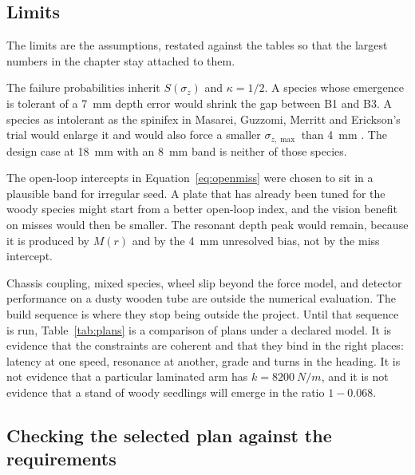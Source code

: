 \subsection{Limits}

The limits are the assumptions, restated against the tables so that the largest numbers in the chapter stay attached to them.

The failure probabilities inherit \(S(\sigma_z)\) and \(\kappa=1/2\). A species whose emergence is tolerant of a \SI{7}{mm} depth error would shrink the gap between B1 and B3. A species as intolerant as the spinifex in Masarei, Guzzomi, Merritt and Erickson's trial would enlarge it and would also force a smaller \(\sigma_{z,\max}\) than \SI{4}{mm} \cite{masarei2019}. The design case at \SI{18}{mm} with an \SI{8}{mm} band is neither of those species.

The open-loop intercepts in Equation~\eqref{eq:openmiss} were chosen to sit in a plausible band for irregular seed. A plate that has already been tuned for the woody species might start from a better open-loop index, and the vision benefit on misses would then be smaller. The resonant depth peak would remain, because it is produced by \(M(r)\) and by the \SI{4}{mm} unresolved bias, not by the miss intercept.

Chassis coupling, mixed species, wheel slip beyond the force model, and detector performance on a dusty wooden tube are outside the numerical evaluation. The build sequence is where they stop being outside the project. Until that sequence is run, Table~\ref{tab:plans} is a comparison of plans under a declared model. It is evidence that the constraints are coherent and that they bind in the right places: latency at one speed, resonance at another, grade and turns in the heading. It is not evidence that a particular laminated arm has \(k=\SI{8200}{N/m}\), and it is not evidence that a stand of woody seedlings will emerge in the ratio \(1-0.068\).

\subsection{Checking the selected plan against the requirements}

